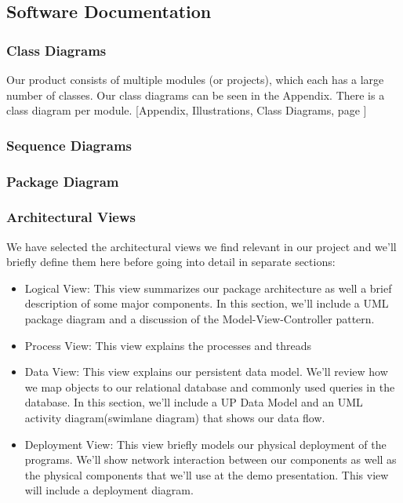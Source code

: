 \subsection{Software Documentation}
\subsubsection{Class Diagrams}
Our product consists of multiple modules (or projects), which each has a large number of classes. Our class diagrams can be seen in the Appendix. There is a class diagram per module.
[Appendix, Illustrations, Class Diagrams, page \pageref{classdiagrams}]
\subsubsection{Sequence Diagrams}
\subsubsection{Package Diagram}

\subsubsection{Architectural Views}
We have selected the architectural views we find relevant in our project and we’ll briefly define them here before going into detail in separate sections:
\begin{itemize}
\item Logical View: This view summarizes our package architecture as well a brief description of some major components. In this section, we’ll include a UML package diagram and a discussion of the Model-View-Controller pattern.
\item Process View: This view explains the processes and threads
\item Data View: This view explains our persistent data model. We’ll review how we map objects to our relational database and commonly used queries in the database. In this section, we’ll include a UP Data Model and an UML activity diagram(swimlane diagram) that shows our data flow.
\item Deployment View: This view briefly models our physical deployment of the programs. We’ll show network interaction between our components as well as the physical components that we’ll use at the demo presentation. This view will include a deployment diagram.
\end{itemize}